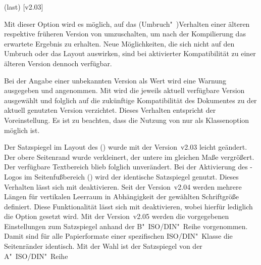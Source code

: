 \begin{Declaration}
  {}
  (last)
  [v2.03]
\printdeclarationlist

Mit dieser Option wird es möglich, auf das (Umbruch"~)Verhalten einer älteren 
respektive früheren Version von \TUDScript umzuschalten, um nach der 
Kompilierung das erwartete Ergebnis zu erhalten. Neue Möglichkeiten, die sich 
nicht auf den Umbruch oder das Layout auswirken, sind bei aktivierter 
Kompatibilität zu einer älteren Version dennoch verfügbar. 

Bei der Angabe einer unbekannten Version als Wert wird eine Warnung ausgegeben 
und  angenommen. Mit  wird die 
jeweils aktuell verfügbare Version ausgewählt und folglich auf die zukünftige 
Kompatibilität des Dokumentes zu der aktuell genutzten Version verzichtet. 
Dieses Verhalten entspricht der Voreinstellung. Es ist zu beachten, dass die 
Nutzung von  nur als Klassenoption möglich ist.
%
\begin{DeclareValues}{}
  Der Satzspiegel im Layout des \CDs () wurde mit 
  der Version~v2.03 leicht geändert. Der obere Seitenrand wurde verkleinert, 
  der untere im gleichen Maße vergrößert. Der verfügbare Textbereich blieb 
  folglich unverändert. Bei der Aktivierung des \DDC-Logos im Seitenfußbereich 
  () wird der identische Satzspiegel genutzt. Dieses 
  Verhalten lässt sich mit  deaktivieren.
  Seit der Version~v2.04 werden mehrere Längen für vertikalen Leerraum in 
  Abhängigkeit der gewählten Schriftgröße definiert. Diese Funktionalität lässt 
  sich mit  deaktivieren, wobei hierfür lediglich die 
  Option  gesetzt wird.
  Mit der Version~v2.05 werden die vorgegebenen Einstellungen zum Satzspiegel 
  anhand der B"~ISO/DIN"~Reihe vorgenommen. Damit sind für alle Papierformate 
  einer spezifischen ISO/DIN"~Klasse die Seitenränder identisch. Mit der Wahl 
   ist der Satzspiegel von der A"~ISO/DIN"~Reihe 

\end{DeclareValues}
\end{Declaration}
